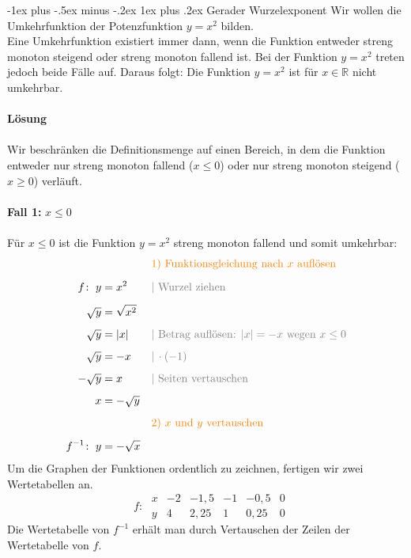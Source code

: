 \documentclass[a4paper,10pt]{article}
\makeatletter
\renewcommand{\subsubsection}{\@startsection{subsubsection}{3}{0mm}%
                                {-1ex plus -.5ex minus -.2ex}%
                                {1ex plus .2ex}%
                                {\normalfont\small\bfseries}}
\makeatother
\begin{document}
\begin{multicols}{3}
    \subsubsection{Gerader Wurzelexponent}
    Wir wollen die Umkehrfunktion der Potenzfunktion $y = x^2$ bilden.\\
    Eine Umkehrfunktion existiert immer dann, wenn die Funktion entweder streng monoton steigend oder streng monoton fallend ist.
    Bei der Funktion $y = x^2$ treten jedoch beide Fälle auf. Daraus folgt: Die Funktion  $y = x^2$
    ist für $x \in \mathbb{R}$ nicht umkehrbar.\\~\\
    \textbf{Lösung}\\~\\
    Wir beschränken die Definitionsmenge auf einen Bereich, in dem die Funktion entweder nur streng monoton fallend ($x \leq 0$) oder nur streng monoton steigend ($x \geq 0$) verläuft.\\~\\
    \textbf{Fall 1:} $x \leq 0$\\~\\
    Für $x \leq 0$ ist die Funktion $y = x^2$ streng monoton fallend und somit umkehrbar:
    \begin{align*} & &&{\color{orange}\text{1) Funktionsgleichung nach $x$ auflösen}} \\[5px] f\colon\; y &= x^2 &&{\color{gray}| \text{ Wurzel ziehen}} \\[5px] \sqrt{y} &= \sqrt{x^2} \\[5px] \sqrt{y} &= |x| &&{\color{gray}| \text{ Betrag auflösen: } |x| = -x \text{ wegen } x \leq 0} \\[5px] \sqrt{y} &= -x &&{\color{gray}|\, \cdot (-1)} \\[5px] -\sqrt{y} &= x &&{\color{gray}| \text{ Seiten vertauschen}} \\[5px] x &= -\sqrt{y} \\[5px] & &&{\color{orange}\text{2) $x$ und $y$ vertauschen}} \\[5px] f^{-1}\colon\; y &= -\sqrt{x} \end{align*}
    Um die Graphen der Funktionen ordentlich zu zeichnen, fertigen wir zwei Wertetabellen an.
    \[ \phantom{^{-1}}f\colon\; \begin{array}{r|c|c|c|c|c} x & -2 & -1{,}5 & -1 & -0{,}5 & 0 \\ \hline y & 4 & 2{,}25 & 1 & 0{,}25 & 0 \end{array}\]
    Die Wertetabelle von $f^{-1}$ erhält man durch Vertauschen der Zeilen der Wertetabelle von $f$.

\end{multicols}
\end{document}

